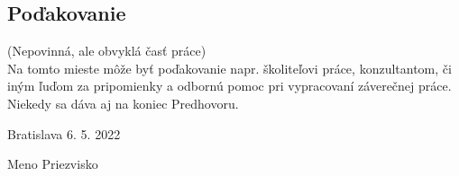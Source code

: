 \null
\vfill

\subsection*{Poďakovanie}

(Nepovinná, ale obvyklá časť práce)\\

Na tomto mieste môže byť poďakovanie napr. školiteľovi práce, konzultantom, či iným ľuďom za pripomienky a odbornú pomoc pri vypracovaní záverečnej práce. Niekedy sa dáva aj na koniec Predhovoru.

\vspace{10pt}

\noindent Bratislava 6. 5. 2022 \hfil
\newline
\begin{flushright}
	Meno Priezvisko$\qquad$
\end{flushright}
\cleardoublepage


	

